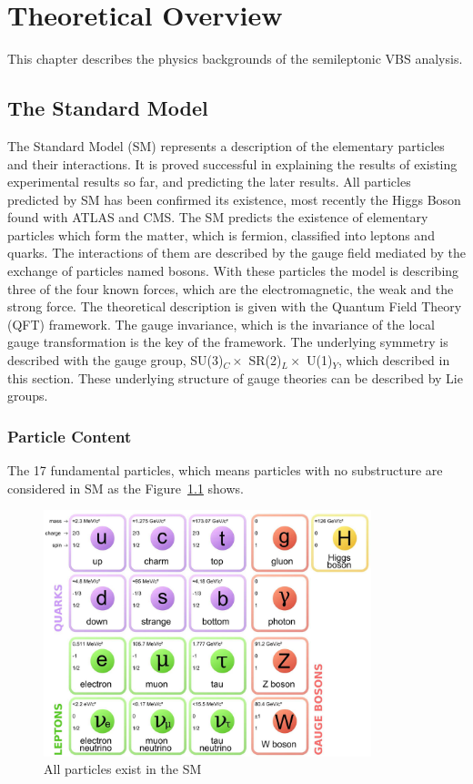 \chapter{Theoretical Overview}

This chapter describes the physics backgrounds of the semileptonic VBS analysis.

\section{The Standard Model}

The Standard Model (SM) represents a description of the elementary particles and their interactions.
It is proved successful in explaining the results of existing experimental results so far, and predicting the later results.
All particles predicted by SM has been confirmed its existence, most recently the Higgs Boson found with ATLAS and CMS.
The SM predicts the existence of elementary particles which form the matter, which is fermion, classified into leptons and quarks.
The interactions of them are described by the gauge field mediated by the exchange of particles named bosons.
With these particles the model is describing three of the four known forces, which are the electromagnetic, the weak and the strong force. 
The theoretical description is given with the Quantum Field Theory (QFT) framework. The gauge invariance, which is the invariance of the local gauge transformation is the key of the framework. The underlying symmetry is described with the gauge group, SU(3)$_C \times$ SR(2)$_L \times$ U(1)$_Y$, which described in this section. These underlying structure of gauge theories can be described by Lie groups.

\subsection{Particle Content}
The 17 fundamental particles, which means particles with no substructure are considered in SM as the Figure~\ref{fig:SM} shows.
\begin{figure}[tbp]
\begin{center}
 \includegraphics[width=0.85\textwidth,keepaspectratio]{figures/SM}
\caption{
All particles exist in the SM %
}
\label{fig:SM}
\end{center}
\end{figure}

